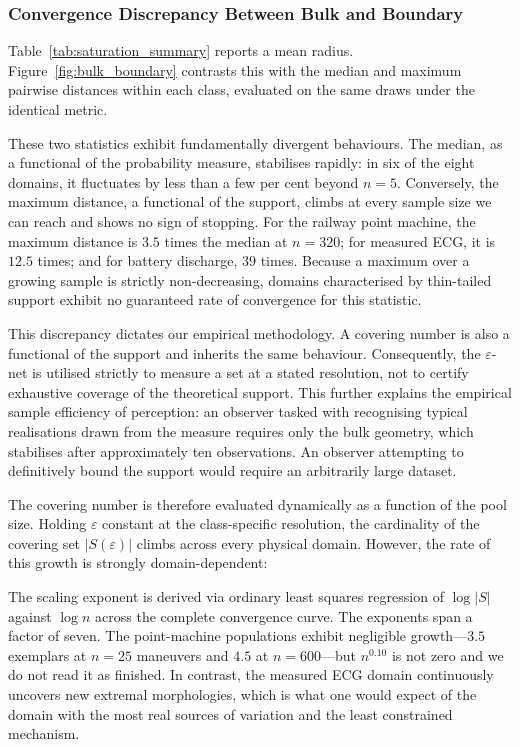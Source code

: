 \documentclass[10pt]{article}
\theoremstyle{plain}
\theoremstyle{definition}
\theoremstyle{remark}
\begin{document}
\subsubsection{Convergence Discrepancy Between Bulk and Boundary}
\label{sec:bulk-boundary}

Table~\ref{tab:saturation_summary} reports a mean radius. Figure~\ref{fig:bulk_boundary}
contrasts this with the median and maximum pairwise distances within each class,
evaluated on the same draws under the identical metric.

These two statistics exhibit fundamentally divergent behaviours. The median, as a
functional of the probability measure, stabilises rapidly: in six of the eight
domains, it fluctuates by less than a few per cent beyond $n=5$. Conversely, the
maximum distance, a functional of the support, climbs at every
sample size we can reach and shows no sign of stopping. For the railway point machine, the maximum distance is
$3.5$ times the median at $n=320$; for measured ECG, it is $12.5$ times; and for
battery discharge, $39$ times. Because a maximum over a growing sample is
strictly non-decreasing, domains characterised by thin-tailed support exhibit no
guaranteed rate of convergence for this statistic.

This discrepancy dictates our empirical methodology. A covering number is also a
functional of the support and inherits the same behaviour. Consequently, the
$\varepsilon$-net is utilised strictly to measure a set at a stated resolution, not to certify exhaustive coverage of the theoretical
support. This further explains the empirical sample efficiency of perception: an
observer tasked with recognising typical realisations drawn from the measure
requires only the bulk geometry, which stabilises after approximately ten
observations. An observer attempting to definitively bound the support would
require an arbitrarily large dataset.

The covering number is therefore evaluated dynamically as a function of the pool
size. Holding $\varepsilon$ constant at the class-specific resolution, the
cardinality of the covering set $|S(\varepsilon)|$ climbs across
every physical domain. However, the rate of this growth is strongly domain-dependent:

\begin{center}\small

\end{center}

The scaling exponent is derived via ordinary least squares regression of
$\log |S|$ against $\log n$ across the complete convergence curve. The exponents
span a factor of seven. The point-machine populations exhibit negligible growth---$3.5$
exemplars at $n=25$ maneuvers and $4.5$ at $n=600$---but $n^{0.10}$ is not zero and we do not read it as finished. In
contrast, the measured ECG domain continuously uncovers new extremal
morphologies, which is what one would expect of the domain with the most real sources of variation and the least constrained mechanism.
\end{document}
